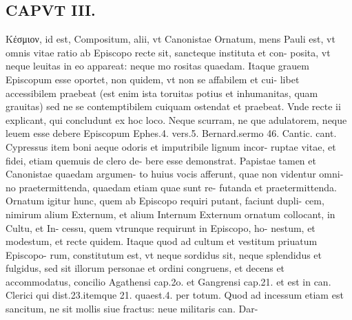 \documentclass{article}
\begin{document}
\begin{pages}
\section*{CAPVT  III. }
\marginpar{[ p.121 ]}\pstart Κέσμιον, id est, Compositum, alii, vt Canonistae Ornatum, mens Pauli est, vt omnis vitae ratio ab Episcopo recte sit, sancteque instituta et con- posita, vt neque leuitas in eo appareat: neque mo rositas quaedam. Itaque grauem Episcopum esse oportet, non quidem, vt non se affabilem et cui- libet accessibilem praebeat (est enim ista toruitas potius et inhumanitas, quam grauitas) sed ne se contemptibilem cuiquam ostendat et praebeat. Vnde recte ii explicant, qui concludunt ex hoc loco. Neque scurram, ne que adulatorem, neque leuem esse debere Episcopum Ephes.4. vers.5. Bernard.sermo 46. Cantic. cant. Cypressus item boni aeque odoris et imputribile lignum incor- ruptae vitae, et fidei, etiam quemuis de clero de- bere esse demonstrat.  \pend\pstart Papistae tamen et Canonistae quaedam argumen- to huius vocis afferunt, quae non videntur omni- no praetermittenda, quaedam etiam quae sunt re- futanda et praetermittenda. Ornatum igitur hunc, quem ab Episcopo requiri putant, faciunt dupli- cem, nimirum alium Externum, et alium Internum Externum ornatum collocant, in Cultu, et In- cessu, quem vtrunque requirunt in Episcopo, ho- nestum, et modestum, et recte quidem. Itaque quod ad cultum et vestitum priuatum Episcopo- rum, constitutum est, vt neque sordidus sit, neque  splendidus et fulgidus, sed sit illorum personae et ordini congruens, et decens et accommodatus, concilio Agathensi cap.2o. et Gangrensi cap.21. et est in can. Clerici qui dist.23.itemque 21. quaest.4. per totum. Quod ad incessum etiam est sancitum, ne sit mollis siue fractus: neue militaris can. Dar-  \pend

\end{pages}
\end{document}
